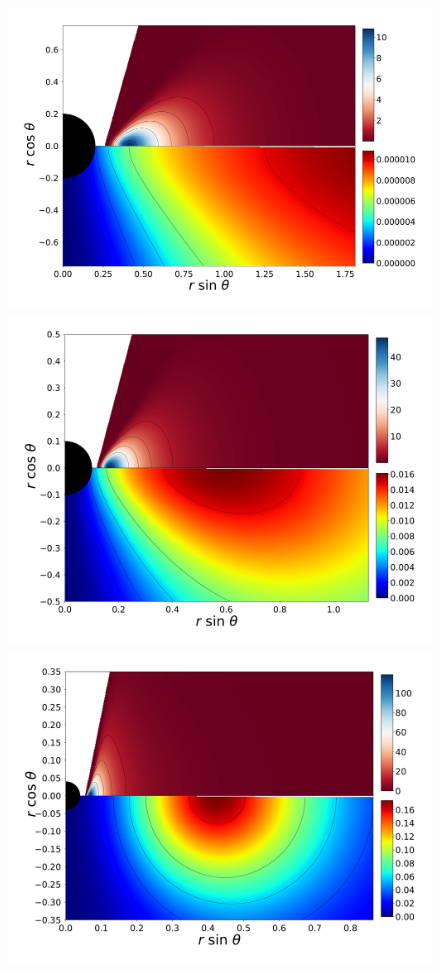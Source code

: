 \documentclass[twocolumn,aps,showpacs,showkeys,prd,superscriptaddress,byrevtex, amsmath]{revtex4-1}
\begin{document}
\begin{figure}
\hspace{-0.2cm}
\\
\includegraphics[scale=0.1267]{figures/fig5_I__10.pdf}
\hspace{-0.3cm}
\includegraphics[scale=0.12]{figures/fig5_IV__10.pdf}
\hspace{-0.3cm}
\includegraphics[scale=0.1267]{figures/fig5_VII__10.pdf}

\end{figure}
\end{document}
